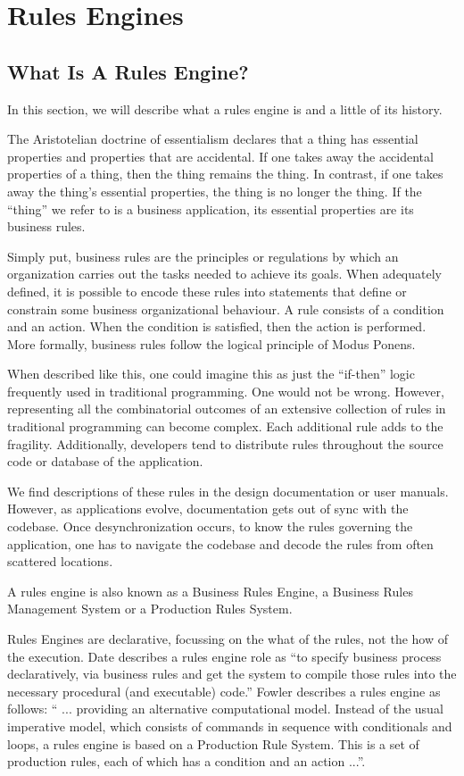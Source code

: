 \section{Rules Engines}

\subsection{What Is A Rules Engine?}

In this section, we will describe what a rules engine is and a little of its history.

The Aristotelian doctrine of essentialism declares that a thing has essential properties and properties that are accidental.
If one takes away the accidental properties of a thing, then the thing remains the thing.
In contrast, if one takes away the thing's essential properties, the thing is no longer the thing.
If the ``thing'' we refer to is a business application, its essential properties are its business rules.

Simply put, business rules are the principles or regulations by which an organization carries out the tasks needed to achieve its goals.
When adequately defined, it is possible to encode these rules into statements that define or constrain some business organizational behaviour.
A rule consists of a condition and an action.
When the condition is satisfied, then the action is performed.
More formally, business rules follow the logical principle of Modus Ponens.

When described like this, one could imagine this as just the ``if-then'' logic frequently used in traditional programming.
One would not be wrong. 
However, representing all the combinatorial outcomes of an extensive collection of rules in traditional programming can become complex.
Each additional rule adds to the fragility.
Additionally, developers tend to distribute rules throughout the source code or database of the application.

We find descriptions of these rules in the design documentation or user manuals.
However, as applications evolve, documentation gets out of sync with the codebase.
Once desynchronization occurs, to know the rules governing the application, one has to navigate the codebase and decode the rules from often scattered locations.

A rules engine is also known as a Business Rules Engine, a Business Rules Management System or a Production Rules System.

Rules Engines are declarative, focussing on the what of the rules, not the how of the execution.
Date\cite{date2000not} describes a rules engine role as ``to specify business process declaratively, via business rules and get the system to compile those rules into the necessary procedural (and executable) code.''
Fowler\cite{Fowler_rulesEngine} describes a rules engine as follows: `` ... providing an alternative computational model.
Instead of the usual imperative model, which consists of commands in sequence with conditionals and loops, a rules engine is based on a Production Rule System.
This is a set of production rules, each of which has a condition and an action ...''.

